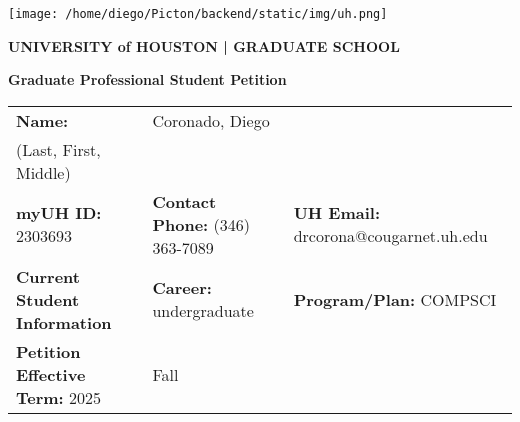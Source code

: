 \documentclass[12pt]{article}
\makeatletter
\newcommand{\firstName}{Diego}
\newcommand{\lastName}{Coronado}
\newcommand{\middleName}{}
\newcommand{\studentID}{2303693}
\newcommand{\phoneNumber}{(346) 363-7089}
\newcommand{\emailAddress}{drcorona@cougarnet.uh.edu}
\newcommand{\programPlan}{COMPSCI}
\newcommand{\academicCareer}{undergraduate}
\newcommand{\yearValue}{2025}
\newcommand{\seasonValue}{Fall}
\makeatother
\begin{document}
\thispagestyle{empty}

\begin{center}
  \texttt{[image: /home/diego/Picton/backend/static/img/uh.png]}
  \vspace{1em}
\end{center}

\begin{center}
  \textbf{\huge \color{gray} UNIVERSITY of \color{red} HOUSTON \color{darkgray} | GRADUATE SCHOOL}
\end{center}

\textbf{\LARGE Graduate Professional Student Petition} 
\vspace{1.5em}

\begin{tabular}{|p{}|p{}|p{}|}
\hline
\textbf{Name:} & \multicolumn{2}{l|}{\lastName, \firstName \middleName} \\
\scriptsize (Last, First, Middle) & \multicolumn{2}{l|}{} \\
\hline
\textbf{myUH ID:} \studentID & \textbf{Contact Phone:} \phoneNumber & \textbf{UH Email:} \emailAddress \\
\hline
\textbf{Current Student Information} & \textbf{Career:} \academicCareer & \textbf{Program/Plan:} \programPlan \\
\hline
\textbf{Petition Effective Term:} \yearValue & \multicolumn{2}{l|}{\seasonValue} \\
\hline
\end{tabular}
\vspace{0.5em}
\end{document}
